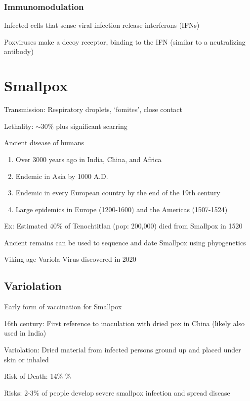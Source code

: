 \documentclass{notes}
\begin{document}
\subsubsection{Immunomodulation}

Infected cells that sense viral infection release interferons (IFNs)

Poxviruses make a decoy receptor, binding to the IFN (similar to a neutralizing antibody)

\section{Smallpox}

Transmission: Respiratory droplets, `fomites', close contact

Lethality: \(\sim\)30\% plus significant scarring

Ancient disease of humans

\begin{enumerate}
    \item Over 3000 years ago in India, China, and Africa
    \item Endemic in Asia by 1000 A.D.
    \item Endemic in every European country by the end of the 19th century
    \item Large epidemics in Europe (1200-1600) and the Americas (1507-1524)
\end{enumerate}

Ex: Estimated 40\% of Tenochtitlan (pop: 200,000) died from Smallpox in 1520

Ancient remains can be used to sequence and date Smallpox using phyogenetics

\tab Viking age Variola Virus discovered in 2020

\subsection{Variolation}

Early form of vaccination for Smallpox

16th century: First reference to inoculation with dried pox in China (likely also used in India)

Variolation: Dried material from infected persons ground up and placed under skin or inhaled

\tab Risk of Death: 14\% \%

Risks: 2-3\% of people develop severe smallpox infection and spread disease
\end{document}
